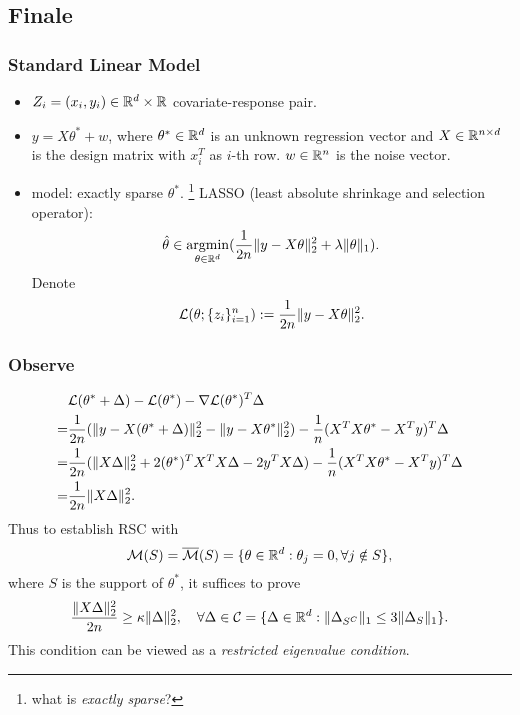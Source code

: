 \subsection{Finale}

\subsubsection{Standard Linear Model}

\begin{itemize}
    \item $Z_i=(x_i,y_i)\in{\mathbb{R}}^d\times{\mathbb{R}}$ covariate-response pair.
    \item $y=X\theta^*+w$,
        where $\theta^*\in{\mathbb{R}}^d$ is an unknown regression vector and
        $X\in{\mathbb{R}}^{n\times d}$ is the design matrix with $x_i^T$ as $i$-th row.
        $w\in{\mathbb{R}}^n$ is the noise vector.
    \item model: exactly sparse $\theta^*$.
        \footnote{what is \emph{exactly sparse}?}
        LASSO (least absolute shrinkage and selection operator):
        \begin{equation}
            {\hat{\theta}}\in\mathop{\mathrm{argmin}}_{\theta\in{\mathbb{R}}^d}(\frac{1}{2n}\|y-X\theta\|_2^2+\lambda\|\theta\|_1).
        \end{equation}
        Denote
        \begin{equation}
            \mathcal{L}(\theta;\{z_i\}_{i=1}^n) := \frac{1}{2n}\|y-X\theta\|_2^2.
        \end{equation}
\end{itemize}

\subsubsection{Observe}

\begin{equation}
\begin{split}
      & \mathcal{L}(\theta^*+\Delta)-\mathcal{L}(\theta^*)-\nabla\mathcal{L}(\theta^*)^T\Delta    \\
    = & \frac{1}{2n}(\|y-X(\theta^*+\Delta)\|_2^2-\|y-X\theta^*\|_2^2)
        - \frac{1}{n}(X^TX\theta^*-X^Ty)^T\Delta  \\
    = & \frac{1}{2n}(\|X\Delta\|_2^2+2(\theta^*)^TX^TX\Delta-2y^TX\Delta)
        - \frac{1}{n}(X^TX\theta^*-X^Ty)^T\Delta  \\
    = & \frac{1}{2n}\|X\Delta\|_2^2.
\end{split}
\end{equation}
Thus to establish RSC with
\begin{equation}
    \mathcal{M}(S) = {\overline{\mathcal{M}}}(S) = \{\theta\in{\mathbb{R}}^d:\theta_j=0, \forall j\notin S\},
\end{equation}
where $S$ is the support of $\theta^*$,
it suffices to prove
\begin{equation}
    \frac{\|X\Delta\|_2^2}{2n}\ge \kappa\|\Delta\|_2^2,\quad
        \forall \Delta\in\mathcal{C}=\{\Delta\in{\mathbb{R}}^d:\|\Delta_{S^C}\|_1\le3\|\Delta_S\|_1\}.
\end{equation}
This condition can be viewed as a \emph{restricted eigenvalue condition}.

